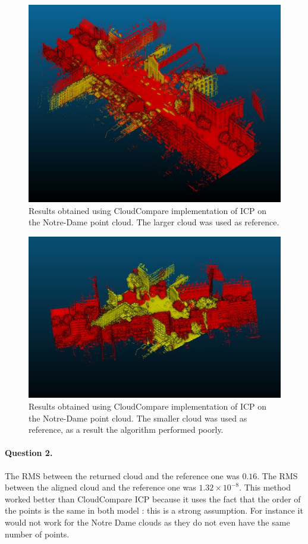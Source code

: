 \documentclass[french]{article}
\begin{document}
\begin{figure}[h]
	\centering
	\includegraphics[width=0.6\linewidth]{q1-nd-12.jpg}
	\caption{Results obtained using CloudCompare implementation of ICP on the Notre-Dame point cloud. The larger cloud was used as reference.}
	\label{fig:q1-nd12}
\end{figure}

\begin{figure}[h]
	\centering
	\includegraphics[width=0.6\linewidth]{q1-nd-21.jpg}
	\caption{Results obtained using CloudCompare implementation of ICP on the Notre-Dame point cloud. The smaller cloud was used as reference, as a result the algorithm performed poorly.}
	\label{fig:q1-nd21}
\end{figure}

\paragraph{Question 2.} The RMS between the returned cloud and the reference one was $0.16$. The RMS between the aligned cloud and the reference one was $1.32\times 10^{-8}$. This method worked better than CloudCompare ICP because it uses the fact that the order of the points is the same in both model : this is a strong assumption. For instance it would not work for the Notre Dame clouds as they do not even have the same number of points.
\end{document}
